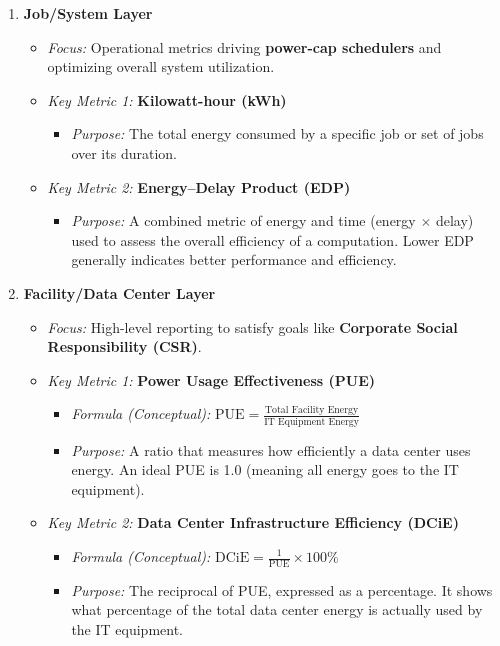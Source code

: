 \begin{enumerate}
    \item \textbf{Job/System Layer}
    \begin{itemize}
        \item \emph{Focus:} Operational metrics driving \textbf{power-cap schedulers} and optimizing overall system utilization.
        \item \emph{Key Metric 1:} \textbf{Kilowatt-hour (kWh)}
        \begin{itemize}
            \item \emph{Purpose:} The total energy consumed by a specific job or set of jobs over its duration.
        \end{itemize}
        \item \emph{Key Metric 2:} \textbf{Energy--Delay Product (EDP)}
        \begin{itemize}
            \item \emph{Purpose:} A combined metric of energy and time (energy $\times$ delay) used to assess the overall efficiency of a computation. Lower EDP generally indicates better performance and efficiency.
        \end{itemize}
    \end{itemize}

    \item \textbf{Facility/Data Center Layer}
    \begin{itemize}
        \item \emph{Focus:} High-level reporting to satisfy goals like \textbf{Corporate Social Responsibility (CSR)}.
        \item \emph{Key Metric 1:} \textbf{Power Usage Effectiveness (PUE)}
        \begin{itemize}
            \item \emph{Formula (Conceptual):} $ \text{PUE} = \frac{\text{Total Facility Energy}}{\text{IT Equipment Energy}} $
            \item \emph{Purpose:} A ratio that measures how efficiently a data center uses energy. An ideal PUE is 1.0 (meaning all energy goes to the IT equipment).
        \end{itemize}
        \item \emph{Key Metric 2:} \textbf{Data Center Infrastructure Efficiency (DCiE)}
        \begin{itemize}
            \item \emph{Formula (Conceptual):} $ \text{DCiE} = \frac{1}{\text{PUE}} \times 100\% $
            \item \emph{Purpose:} The reciprocal of PUE, expressed as a percentage. It shows what percentage of the total data center energy is actually used by the IT equipment.
        \end{itemize}
    \end{itemize}
\end{enumerate}

